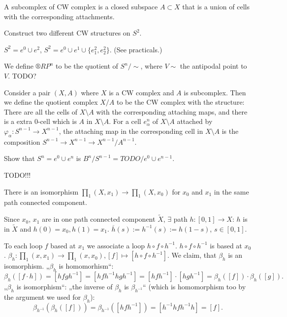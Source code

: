 \documentclass[12pt]{article}					%
\begin{document}
\begin{definice}
	A subcomplex of CW complex is a closed subspace $A \subset X$ that is a union of cells with the corresponding attachments.
\end{definice}

\begin{priklad}
	Construct two different CW structures on $S^2$.
	
	\begin{reseni}
		$S^2 = e^0 \cup e^2$, $S^2 = e^0 \cup e^1 \cup \{e^2_1, e^2_2\}$. (See practicals.)
	\end{reseni}
\end{priklad}

\begin{priklad}
	We define $®RP^n$ to be the quotient of $S^n / \sim$, where $V \sim $ the antipodal point to $V$. TODO?
\end{priklad}

\begin{definice}
	Consider a pair $(X, A)$ where $X$ is a CW complex and $A$ is subcomplex. Then we define the quotient complex $X / A$ to be the CW complex with the structure: There are all the cells of $X \setminus A$ with the corresponding attaching maps, and there is a extra $0$-cell which is $A$ in $X \setminus A$. For a cell $e_α^n$ of $X \setminus A$ attached by $φ_α: S^{n-1} \rightarrow X^{n - 1}$, the attaching map in the corresponding cell in $X \setminus A$ is the composition $S^{n-1} \rightarrow X^{n-1} \rightarrow X^{n-1} / A^{n-1}$.
\end{definice}

\begin{priklad}
	Show that $S^n = e^0 \cup e^n$ is $B^n / S^{n-1} = TODO / e^0 \cup e^{n-1}$.
\end{priklad}


TODO!!!


\begin{tvrzeni}
	There is an isomorphism $∏_1(X, x_1) \rightarrow ∏_1(X, x_0)$ for $x_0$ and $x_1$ in the same path connected component.

	\begin{dukazin}
		Since $x_0$, $x_1$ are in one path connected component $\tilde X$, $\exists$ path $h: [0, 1] \rightarrow X$: $h$ is in $\tilde X$ and $h(0) = x_0, h(1) = x_1$. $\overline{h}(s) := h^{-1}(s) := h(1 - s)$, $s \in [0, 1]$.

		To each loop $f$ based at $x_1$ we associate a loop $h∘f∘h^{-1}$. $h∘f∘h^{-1}$ is based at $x_0$. $β_h : ∏_1(x, x_1) \rightarrow ∏_1(x, x_0), [f] \mapsto [h∘f∘h^{-1}]$. We claim, that $β_h$ is an isomorphism. „$β_h$ is homomorhism“:
		$$ β_h([f·h]) = [hfgh^{-1}] = [hfh^{-1} hgh^{-1}] = [hfh^{-1}]·[hgh^{-1}] = β_h([f])·β_h([g]). $$
		„$β_h$ is isomorphism“: „the inverse of $β_h$ is $β_{h^{-1}}$“ (which is homomorphism too by the argument we used for $β_h$):
		$$ β_{h^{-1}}(β_h([f])) = β_{h^{-1}}([hfh^{-1}]) = [h^{-1}hfh^{-1}h] = [f]. $$
	\end{dukazin}
\end{tvrzeni}
\end{document}
